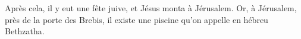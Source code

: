 Après cela, il y eut une fête juive, et Jésus monta à Jérusalem.
Or, à Jérusalem, près de la porte des Brebis,
	il existe une piscine qu’on appelle en hébreu Bethzatha.
